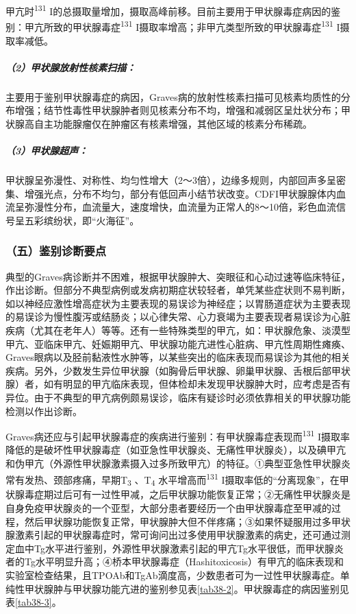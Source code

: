 甲亢时\textsuperscript{131}
I的总摄取量增加，摄取高峰前移。目前主要用于甲状腺毒症病因的鉴别：甲亢所致的甲状腺毒症\textsuperscript{131}
I摄取率增高；非甲亢类型所致的甲状腺毒症\textsuperscript{131}
I摄取率减低。

\subparagraph{（2）甲状腺放射性核素扫描：}

主要用于鉴别甲状腺毒症的病因，Graves病的放射性核素扫描可见核素均质性的分布增强；结节性毒性甲状腺肿者则见核素分布不均，增强和减弱区呈灶状分布；甲状腺高自主功能腺瘤仅在肿瘤区有核素增强，其他区域的核素分布稀疏。

\subparagraph{（3）甲状腺超声：}

甲状腺呈弥漫性、对称性、均匀性增大（2～3倍），边缘多规则，内部回声多呈密集、增强光点，分布不均匀，部分有低回声小结节状改变。CDFI甲状腺腺体内血流呈弥漫性分布，血流量大，速度增快，血流量为正常人的8～10倍，彩色血流信号呈五彩缤纷状，即“火海征”。

\subsubsection{（五）鉴别诊断要点}

典型的Graves病诊断并不困难，根据甲状腺肿大、突眼征和心动过速等临床特征，作出诊断。但部分不典型病例或发病初期症状较轻者，单凭某些症状则不易判断，如以神经应激性增高症状为主要表现的易误诊为神经症；以胃肠道症状为主要表现的易误诊为慢性腹泻或结肠炎；以心律失常、心力衰竭为主要表现者易误诊为心脏疾病（尤其在老年人）等等。还有一些特殊类型的甲亢，如：甲状腺危象、淡漠型甲亢、亚临床甲亢、妊娠期甲亢、甲状腺功能亢进性心脏病、甲亢性周期性瘫痪、Graves眼病以及胫前黏液性水肿等，以某些突出的临床表现而易误诊为其他的相关疾病。另外，少数发生异位甲状腺（如胸骨后甲状腺、卵巢甲状腺、舌根后部甲状腺）者，如有明显的甲亢临床表现，但体检却未发现甲状腺肿大时，应考虑是否有异位。由于不典型的甲亢病例颇易误诊，临床有疑诊时必须依靠相关的甲状腺功能检测以作出诊断。

Graves病还应与引起甲状腺毒症的疾病进行鉴别：有甲状腺毒症表现而\textsuperscript{131}
I摄取率降低的是破坏性甲状腺毒症（如亚急性甲状腺炎、无痛性甲状腺炎），以及碘甲亢和伪甲亢（外源性甲状腺激素摄入过多所致甲亢）的特征。①典型亚急性甲状腺炎常有发热、颈部疼痛，早期T\textsubscript{3}
、T\textsubscript{4} 水平增高而\textsuperscript{131}
I摄取率低的“分离现象”，在甲状腺毒症期过后可有一过性甲减，之后甲状腺功能恢复正常；②无痛性甲状腺炎是自身免疫甲状腺炎的一个亚型，大部分患者要经历一个由甲状腺毒症至甲减的过程，然后甲状腺功能恢复正常，甲状腺肿大但不伴疼痛；③如果怀疑服用过多甲状腺激素引起的甲状腺毒症时，常可询问出过多使用甲状腺激素的病史，还可通过测定血中Tg水平进行鉴别，外源性甲状腺激素引起的甲亢Tg水平很低，而甲状腺炎者的Tg水平明显升高；④桥本甲状腺毒症（Hashitoxicosis）有甲亢的临床表现和实验室检查结果，且TPOAb和TgAb滴度高，少数患者可为一过性甲状腺毒症。单纯性甲状腺肿与甲状腺功能亢进的鉴别参见表\ref{tab38-2}。甲状腺毒症的病因鉴别见表\ref{tab38-3}。

